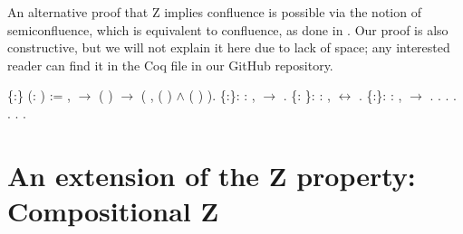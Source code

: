 An alternative proof that Z implies confluence is possible via the
    notion of semiconfluence, which is equivalent to confluence, as
    done in \cite{zproperty}. Our proof is also constructive, but we
    will not explain it here due to lack of space; any
    interested reader can find it in the Coq file in our GitHub
    repository. \begin{coqdoccode}
\coqdocemptyline
\coqdocnoindent
{}  \{:\} (:  ) := \coqdockw{\ensuremath{\forall}}   ,    \ensuremath{\rightarrow} ( )   \ensuremath{\rightarrow} (\coqdoctac{\ensuremath{\exists}} , ( )   \ensuremath{\land} ( )  ).\coqdoceol
\coqdocemptyline
\coqdocnoindent
{}  \{:\}: \coqdockw{\ensuremath{\forall}} :  ,   \ensuremath{\rightarrow}  .\coqdoceol
\coqdocemptyline
\coqdocnoindent
{}  \{: \}: \coqdockw{\ensuremath{\forall}} :  ,   \ensuremath{\leftrightarrow}  .\coqdoceol
\coqdocemptyline
\coqdocnoindent
{}  \{:\}: \coqdockw{\ensuremath{\forall}} :  ,   \ensuremath{\rightarrow}  .\coqdoceol
\coqdocnoindent
{}.\coqdoceol
\coqdocindent{1.00em}
  .\coqdoceol
\coqdocindent{1.00em}
 .\coqdoceol
\coqdocindent{1.00em}
  .\coqdoceol
\coqdocindent{1.00em}
 .\coqdoceol
\coqdocnoindent
{}.\coqdoceol
\coqdocemptyline
\end{coqdoccode}
\section{An extension of the Z property: Compositional Z}




